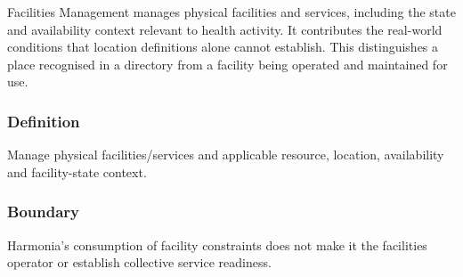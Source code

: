 Facilities Management manages physical facilities and services, including the state and availability context relevant to health activity. It contributes the real-world conditions that location definitions alone cannot establish. This distinguishes a place recognised in a directory from a facility being operated and maintained for use.

\subsubsection*{Definition}

Manage physical facilities/\allowbreak{}services and applicable resource, location, availability and facility-state context.

\subsubsection*{Boundary}

Harmonia's consumption of facility constraints does not make it the facilities operator or establish collective service readiness.

